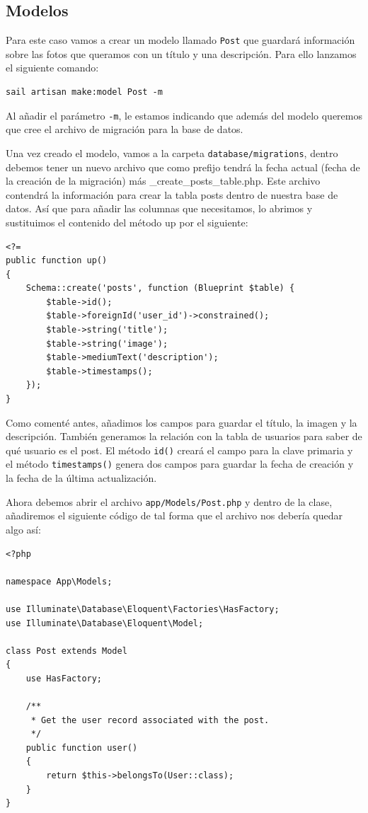\documentclass[11pt]{article}
\begin{document}
\subsection{Modelos}
\label{sec:orgea71ea3}
Para este caso vamos a crear un modelo llamado \texttt{Post} que guardará
información sobre las fotos que queramos con un título y una
descripción. Para ello lanzamos el siguiente comando:
\begin{verbatim}
sail artisan make:model Post -m
\end{verbatim}

Al añadir el parámetro \texttt{-m}, le estamos indicando que además del modelo
queremos que cree el archivo de migración para la base de datos.

Una vez creado el modelo, vamos a la carpeta \texttt{database/migrations},
dentro debemos tener un nuevo archivo que como prefijo tendrá la fecha
actual (fecha de la creación de la migración) más
\_create\_posts\_table.php. Este archivo contendrá la información para
crear la tabla posts dentro de nuestra base de datos. Así que para
añadir las columnas que necesitamos, lo abrimos y sustituimos el
contenido del método up por el siguiente:

\begin{verbatim}
<?=
public function up()
{
    Schema::create('posts', function (Blueprint $table) {
        $table->id();
        $table->foreignId('user_id')->constrained();
        $table->string('title');
        $table->string('image');
        $table->mediumText('description');
        $table->timestamps();
    });
}
\end{verbatim}


Como comenté antes, añadimos los campos para guardar el título, la
imagen y la descripción. También generamos la relación con la tabla de
usuarios para saber de qué usuario es el post. El método \texttt{id()} creará
el campo para la clave primaria y el método \texttt{timestamps()} genera dos
campos para guardar la fecha de creación y la fecha de la última
actualización.

Ahora debemos abrir el archivo \texttt{app/Models/Post.php} y dentro de la
clase, añadiremos el siguiente código de tal forma que el archivo nos
debería quedar algo así:
\begin{verbatim}
<?php

namespace App\Models;

use Illuminate\Database\Eloquent\Factories\HasFactory;
use Illuminate\Database\Eloquent\Model;

class Post extends Model
{
    use HasFactory;

    /**
     * Get the user record associated with the post.
     */
    public function user()
    {
        return $this->belongsTo(User::class);
    }
}
\end{verbatim}
\end{document}
